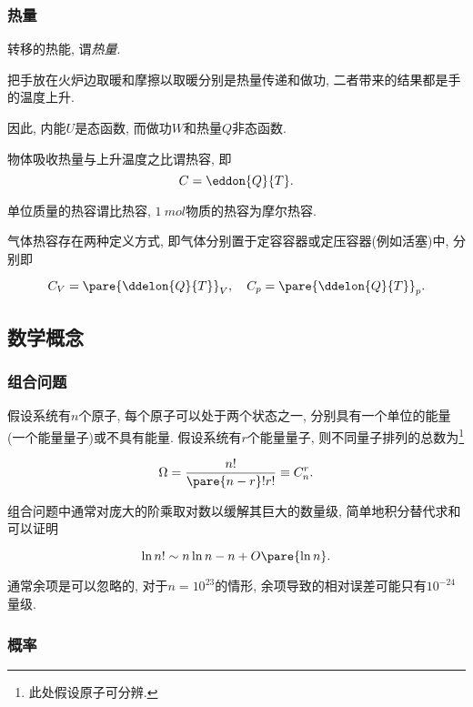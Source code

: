 \documentclass[../Thermal.tex]{subfiles}
\begin{document}
\subsubsection{热量}
转移的热能, 谓\emph{热量}.
\begin{ex}
把手放在火炉边取暖和摩擦以取暖分别是热量传递和做功, 二者带来的结果都是手的温度上升.
\end{ex}
\begin{ex}
因此, 内能$U$是态函数, 而做功$W$和热量$Q$非态函数.
\end{ex}
\begin{definition}[热容]
物体吸收热量与上升温度之比谓热容, 即
\[ C = \eddon{Q}{T}. \]
\end{definition}
\begin{definition}[比热容与摩尔热容]
单位质量的热容谓比热容, $\SI{1}{mol}$物质的热容为摩尔热容.
\end{definition}
气体热容存在两种定义方式, 即气体分别置于定容容器或定压容器(例如活塞)中, 分别即
\begin{finale}
\[ C_V = \pare{\ddelon{Q}{T}}_V, \quad C_p = \pare{\ddelon{Q}{T}}_p.\]
\end{finale}
\subsection{数学概念}
\subsubsection{组合问题}
\begin{ex}
假设系统有$n$个原子, 每个原子可以处于两个状态之一, 分别具有一个单位的能量(一个能量量子)或不具有能量. 假设系统有$r$个能量量子, 则不同量子排列的总数为\footnote{此处假设原子可分辨.}
\begin{finale}
\[ \Omega = \frac{n!}{\pare{n-r}!r!} \equiv C_n^r. \]
\end{finale}
\end{ex}
组合问题中通常对庞大的阶乘取对数以缓解其巨大的数量级, 简单地积分替代求和可以证明
\begin{theorem}[粗糙的Stiring近似]
\[ \ln n! \sim n \ln n - n + O\pare{\ln n}. \]
\end{theorem}
\begin{ex}
通常余项是可以忽略的, 对于$n=10^{23}$的情形, 余项导致的相对误差可能只有$10^{-24}$量级.
\end{ex}
\subsubsection{概率}
\end{document}
